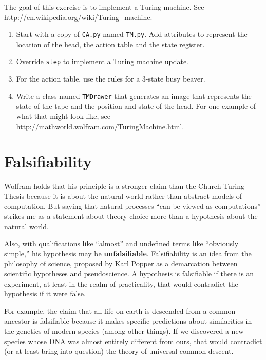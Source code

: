 \documentclass[10pt]{book}
\begin{document}
\begin{ex}

The goal of this exercise is to implement a Turing machine.
See \url{http://en.wikipedia.org/wiki/Turing_machine}.

\begin{enumerate}

\item Start with a copy of {\tt CA.py} named {\tt TM.py}.
Add attributes to represent the location of the head, the action
table and the state register.

\item Override {\tt step} to implement a Turing machine update.

\item For the action table, use the rules for a 3-state busy beaver.

\item Write a class named {\tt TMDrawer} that generates an
image that represents the state of the tape and the position and
state of the head.  For one example of what that might look like,
see \url{http://mathworld.wolfram.com/TuringMachine.html}.

\end{enumerate}

\end{ex}


\section{Falsifiability}

Wolfram holds that his principle is a stronger claim than the
Church-Turing Thesis because it is about the natural world rather
than abstract models of computation.  But saying that natural processes
``can be viewed as computations'' strikes me as a statement about
theory choice more than a hypothesis about the natural world.

Also, with qualifications like
``almost'' and undefined terms like ``obviously simple,'' his
hypothesis may be {\bf unfalsifiable}.  Falsifiability is
an idea from the philosophy of science, proposed by Karl Popper
as a demarcation between scientific hypotheses and pseudoscience.
A hypothesis is falsifiable if there is an experiment, at least
in the realm of practicality, that would contradict the hypothesis
if it were false.

For example, the claim that all life on earth is descended
from a common ancestor is falsifiable because it makes specific
predictions about similarities in the genetics of modern species
(among other things).  If we discovered a new species whose
DNA was almost entirely different from ours, that would
contradict (or at least bring into question) the theory of
universal common descent.
\end{document}
